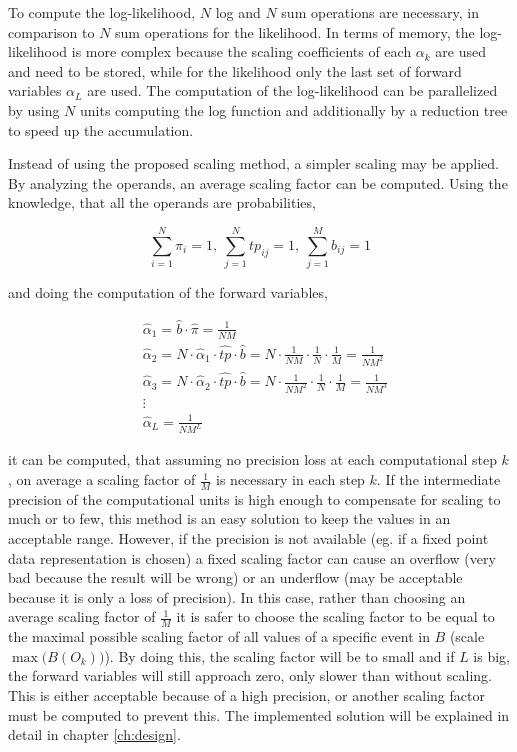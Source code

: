 \documentclass[mscthesis]{usiinfthesis}
\begin{document}
To compute the log-likelihood, $N$ log and $N$ sum operations are necessary, in
comparison to $N$ sum operations for the likelihood. In terms of memory, the
log-likelihood is more complex because the scaling coefficients of each
$\alpha_k$ are used and need to be stored, while for the likelihood only the
last set of forward variables $\alpha_L$ are used. The computation of the
log-likelihood can be parallelized by using $N$ units computing the log
function and additionally by a reduction tree to speed up the accumulation.

Instead of using the proposed scaling method, a simpler scaling may be applied.
By analyzing the operands, an average scaling factor can be computed. Using the
knowledge, that all the operands are probabilities,

\begin{equation}
    \sum\limits_{i=1}^{N} \pi_i = 1, \
    \sum\limits_{j=1}^{N} tp_{ij} = 1, \
    \sum\limits_{j=1}^{M} b_{ij} = 1
\end{equation}

and doing the computation of the forward variables,

\begin{equation}\begin{split}
    &\hat{\alpha}_1 = \hat{b} \cdot \hat{\pi} = \frac{1}{NM} \\
    &\hat{\alpha}_2 = N \cdot \hat{\alpha}_1 \cdot \hat{tp} \cdot \hat{b} =
        N \cdot \frac{1}{NM} \cdot \frac{1}{N} \cdot \frac{1}{M} =
        \frac{1}{NM^2} \\
    &\hat{\alpha}_3 = N \cdot \hat{\alpha}_2 \cdot \hat{tp} \cdot \hat{b} =
        N \cdot \frac{1}{NM^2} \cdot \frac{1}{N} \cdot \frac{1}{M} =
        \frac{1}{NM^3} \\
    &\vdots\\
    & \hat{\alpha}_L = \frac{1}{NM^L}
\end{split}\end{equation}

it can be computed, that assuming no precision loss at each computational step
$k$, on average a scaling factor of $\frac{1}{M}$ is necessary in each step
$k$. If the intermediate precision of the computational units is high enough to
compensate for scaling to much or to few, this method is an easy solution to
keep the values in an acceptable range. However, if the precision is not
available (eg. if a fixed point data representation is chosen) a fixed scaling
factor can cause an overflow (very bad because the result will be wrong) or an
underflow (may be acceptable because it is only a loss of precision). In this
case, rather than choosing an average scaling factor of $\frac{1}{M}$ it is
safer to choose the scaling factor to be equal to the maximal possible scaling
factor of all values of a specific event in $B$ (scale $\max\big(B(O_k)\big)$).
By doing this, the scaling factor will be to small and if $L$ is big, the
forward variables will still approach zero, only slower than without scaling.
This is either acceptable because of a high precision, or another scaling
factor must be computed to prevent this. The implemented solution will be
explained in detail in chapter \ref{ch:design}.
\end{document}
